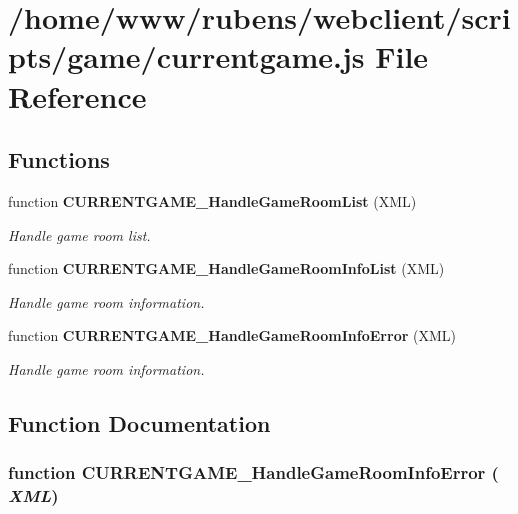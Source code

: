 \section{/home/www/rubens/webclient/scripts/game/currentgame.js File Reference}
\label{currentgame_8js}
\subsection*{Functions}
\begin{CompactItemize}
\item 
function {\bf CURRENTGAME\_\-HandleGameRoomList} (XML)
\begin{CompactList}\small\item\em Handle game room list. \item\end{CompactList}\item 
function {\bf CURRENTGAME\_\-HandleGameRoomInfoList} (XML)
\begin{CompactList}\small\item\em Handle game room information. \item\end{CompactList}\item 
function {\bf CURRENTGAME\_\-HandleGameRoomInfoError} (XML)
\begin{CompactList}\small\item\em Handle game room information. \item\end{CompactList}\end{CompactItemize}


\subsection{Function Documentation}
\subsubsection[CURRENTGAME\_\-HandleGameRoomInfoError]{\setlength{\rightskip}{0pt plus 5cm}function CURRENTGAME\_\-HandleGameRoomInfoError ( {\em XML})}\label{currentgame_8js_47923037ba80bd3755a36de3b75171f4}


